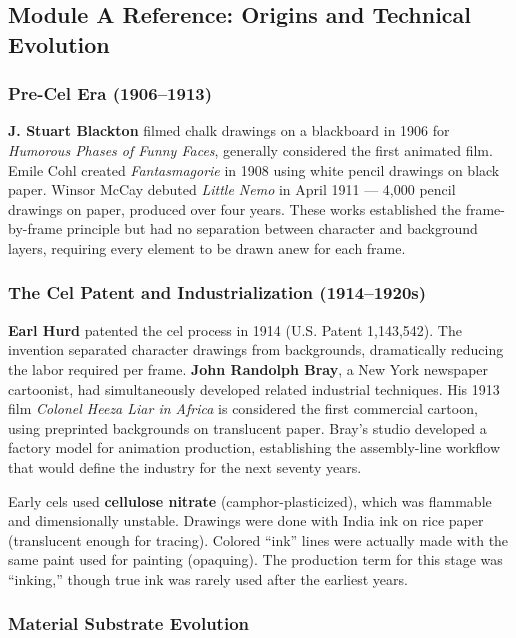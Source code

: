 \documentclass[11pt,letterpaper]{article}
\begin{document}
\subsection{Module A Reference: Origins and Technical Evolution}

\subsubsection{Pre-Cel Era (1906--1913)}

\textbf{J. Stuart Blackton} filmed chalk drawings on a blackboard in 1906 for \textit{Humorous Phases of Funny Faces}, generally considered the first animated film. Emile Cohl created \textit{Fantasmagorie} in 1908 using white pencil drawings on black paper. Winsor McCay debuted \textit{Little Nemo} in April 1911 --- 4,000 pencil drawings on paper, produced over four years. These works established the frame-by-frame principle but had no separation between character and background layers, requiring every element to be drawn anew for each frame.

\subsubsection{The Cel Patent and Industrialization (1914--1920s)}

\textbf{Earl Hurd} patented the cel process in 1914 (U.S. Patent 1,143,542). The invention separated character drawings from backgrounds, dramatically reducing the labor required per frame. \textbf{John Randolph Bray}, a New York newspaper cartoonist, had simultaneously developed related industrial techniques. His 1913 film \textit{Colonel Heeza Liar in Africa} is considered the first commercial cartoon, using preprinted backgrounds on translucent paper. Bray's studio developed a factory model for animation production, establishing the assembly-line workflow that would define the industry for the next seventy years.

Early cels used \textbf{cellulose nitrate} (camphor-plasticized), which was flammable and dimensionally unstable. Drawings were done with India ink on rice paper (translucent enough for tracing). Colored ``ink'' lines were actually made with the same paint used for painting (opaquing). The production term for this stage was ``inking,'' though true ink was rarely used after the earliest years.

\subsubsection{Material Substrate Evolution}
\end{document}
